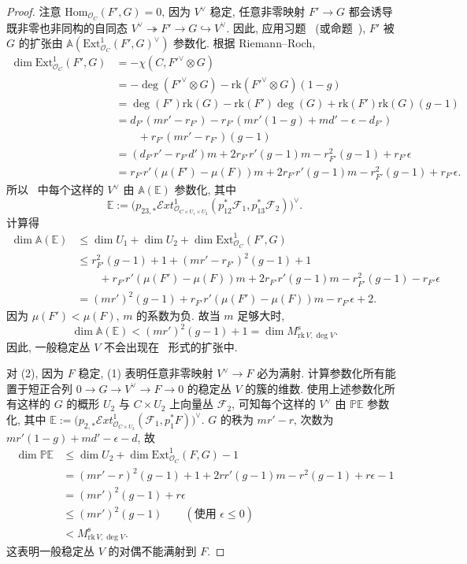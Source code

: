 \begin{proof}
注意 $\mathrm{Hom}_{\mathcal O_C}(F',G)=0$, 因为 $V^\vee$ 稳定, 任意非零映射 $F'\to G$ 都会诱导既非零也非同构的自同态 $V^\vee\twoheadrightarrow F'\to G\hookrightarrow V^\vee$. 因此, 应用习题~ (或命题~), $F'$ 被 $G$ 的扩张由 $\mathbb A(\mathrm{Ext}^1_{\mathcal O_C}(F',G)^\vee)$ 参数化. 根据 Riemann--Roch,
\[
\begin{aligned}
\dim\mathrm{Ext}^1_{\mathcal O_C}(F',G)&=-\chi(C,F'^\vee\otimes G)\\
&=-\deg(F'^\vee\otimes G)-\mathrm{rk}(F'^\vee\otimes G)(1-g)\\
&=\deg(F')\mathrm{rk}(G)-\mathrm{rk}(F')\deg(G)+\mathrm{rk}(F')\mathrm{rk}(G)(g-1)\\
&=d_{F'}(mr'-r_{F'})-r_{F'}(mr'(1-g)+md'-\epsilon-d_{F'})\\
&\qquad+r_{F'}(mr'-r_{F'})(g-1)\\
&=(d_{F'}r'-r_{F'}d')m+2r_{F'}r'(g-1)m-r_{F'}^2(g-1)+r_{F'}\epsilon\\
&=r_{F'}r'(\mu(F')-\mu(F))m+2r_{F'}r'(g-1)m-r_{F'}^2(g-1)+r_{F'}\epsilon.
\end{aligned}
\]
所以~ 中每个这样的 $V^\vee$ 由 $\mathbb A(\mathbb E)$ 参数化, 其中
\[
\mathbb E:=\big(p_{23,*}\mathcal E\!xt^1_{\mathcal O_{C\times U_1\times U_2}}(p_{12}^*\mathcal F_1,p_{13}^*\mathcal F_2)\big)^\vee.
\]
计算得
\[
\begin{aligned}
\dim\mathbb A(\mathbb E)&\leq\dim U_1+\dim U_2+\dim\mathrm{Ext}^1_{\mathcal O_C}(F',G)\\
&\leq r_{F'}^2(g-1)+1+(mr'-r_{F'})^2(g-1)+1\\
&\qquad+r_{F'}r'(\mu(F')-\mu(F))m+2r_{F'}r'(g-1)m-r_{F'}^2(g-1)-r_{F'}\epsilon\\
&=(mr')^2(g-1)+r_{F'}r'(\mu(F')-\mu(F))m-r_{F'}\epsilon+2.
\end{aligned}
\]
因为 $\mu(F')<\mu(F)$, $m$ 的系数为负. 故当 $m$ 足够大时,
\[
\dim\mathbb A(\mathbb E)<(mr')^2(g-1)+1=\dim M_{\mathrm{rk}\,V,\deg V}^{\mathrm s}.
\]
因此, 一般稳定丛 $V$ 不会出现在~ 形式的扩张中.

对 (2), 因为 $F$ 稳定, (1) 表明任意非零映射 $V^\vee\to F$ 必为满射. 计算参数化所有能置于短正合列 $0\to G\to V^\vee\to F\to0$ 的稳定丛 $V$ 的簇的维数. 使用上述参数化所有这样的 $G$ 的概形 $U_2$ 与 $C\times U_2$ 上向量丛 $\mathcal F_2$, 可知每个这样的 $V^\vee$ 由 $\mathbb P\mathbb E$ 参数化, 其中 $\mathbb E:=\big(p_{2,*}\mathcal E\!xt^1_{\mathcal O_{C\times U_2}}(\mathcal F_1,p_1^*F)\big)^\vee$. $G$ 的秩为 $mr'-r$, 次数为 $mr'(1-g)+md'-\epsilon-d$, 故
\[
\begin{aligned}
\dim\mathbb P\mathbb E&\leq\dim U_2+\dim\mathrm{Ext}^1_{\mathcal O_C}(F,G)-1\\
&=(mr'-r)^2(g-1)+1+2rr'(g-1)m-r^2(g-1)+r\epsilon-1\\
&=(mr')^2(g-1)+r\epsilon\\
&\leq(mr')^2(g-1)\qquad(\text{使用 }\epsilon\leq0)\\
&<M_{\mathrm{rk}\,V,\deg V}^{\mathrm s}.
\end{aligned}
\]
这表明一般稳定丛 $V$ 的对偶不能满射到 $F$.
\end{proof}
